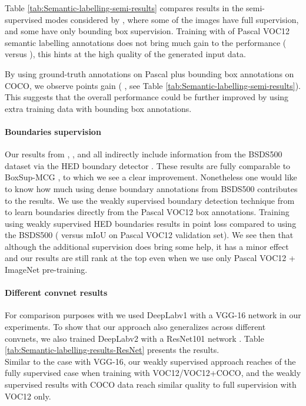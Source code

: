 \documentclass[10pt,english,british,twocolumn]{article}
\begin{document}
Table \ref{tab:Semantic-labelling-semi-results} compares results
in the semi-supervised modes considered by \cite{Dai2015Iccv,Papandreou2015Iccv},
where some of the images have full supervision, and some have only
bounding box supervision. Training with  of Pascal VOC12 semantic
labelling annotations does not bring much gain to the performance
( versus ), this hints at the high quality of the generated
 input data. 

By using ground-truth annotations on Pascal plus bounding box annotations
on COCO, we observe  points gain (
, see Table \ref{tab:Semantic-labelling-semi-results}). This suggests
that the overall performance could be further improved by using extra
training data with bounding box annotations.

\paragraph{Boundaries supervision}

Our results from , , and 
all indirectly include information from the BSDS500 dataset \cite{ArbelaezMaireFowlkesMalikPAMI11}
via the HED boundary detector \cite{Xie2015Iccv}. These results are
fully comparable to BoxSup-MCG \cite{Dai2015Iccv}, to which we see
a clear improvement. Nonetheless one would like to know how much using
dense boundary annotations from BSDS500 contributes to the results.
We use the weakly supervised boundary detection technique from \cite{Khoreva2016Cvpr}
to learn boundaries directly from the Pascal VOC12 box annotations.
Training  using weakly supervised HED
boundaries results in  point loss compared to using the BSDS500
( versus  mIoU on Pascal VOC12 validation set). We see
then that although the additional supervision does bring some help,
it has a minor effect and our results are still rank at the top even
when we use only Pascal VOC12 + ImageNet pre-training.

\paragraph{Different convnet results}

For comparison purposes with \cite{Dai2015Iccv,Papandreou2015Iccv}
we used Deep\-Lab\-v1 with a VGG-16 network in our experiments.
To show that our approach also generalizes across different convnets,
we also trained Deep\-Lab\-v2 with a ResNet101 network \cite{Chen2016ArxivDeeplabv2}.
Table \ref{tab:Semantic-labelling-results-ResNet} presents the results.\\
Similar to the case with VGG-16, our weakly supervised approach 
reaches  of the fully supervised case when training
with VOC12/VOC12+COCO, and the weakly supervised results with COCO
data reach similar quality to full supervision with VOC12 only.
\end{document}
